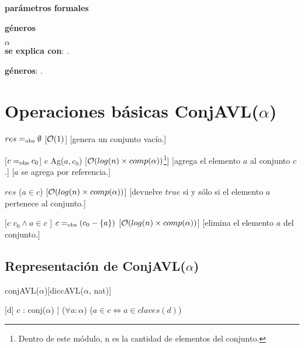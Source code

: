 \begin{Interfaz}
  \textbf{parámetros formales}\parindent\\
  \parbox{1.7cm}{\textbf{géneros}} $\alpha$\\	
	
  \textbf{se explica con}: .

  \textbf{géneros}: .

  \section*{Operaciones básicas ConjAVL($\alpha$)}

  {$res =_{\mathrm{obs}} \emptyset$}
  [$\mathcal{O}(1)$]
  [genera un conjunto vacío.]

  [$c =_{\mathrm{obs}} c_0$]  
  {$c$ \igobs Ag($a,c_0$)}
  [$\mathcal{O}(log(n) \times comp(\alpha))$\footnote{Dentro de este módulo, n es la cantidad de elementos del conjunto.}]
  [agrega el elemento $a$ al conjunto $c$.]
  [$a$ se agrega por referencia.]
    
  {$res$ \igobs ($a\in c$) }
  [$\mathcal{O}(log(n) \times comp(\alpha))$]
  [devuelve $true$ si y sólo si el elemento $a$ pertenece al conjunto.]
  
  [$c$ \igobs $c_0 \land a \in c$ ]
  {$c =_{\mathrm{obs}} (c_0 - \{a\})$}
  [$\mathcal{O}(log(n) \times comp(\alpha))$]
  [elimina el elemento $a$ del conjunto.] 
  
\end{Interfaz}

\begin{Representacion}
    
  \section*{Representación de ConjAVL($\alpha$)}

  \begin{Estructura}{conjAVL($\alpha$)}[diccAVL($\alpha$, nat)]
  \end{Estructura}
  
  
  [d]{
	$c$ : conj($\alpha$) | ($\forall a: \alpha$) ($a\in c \Leftrightarrow a\in claves(d)$)}
\end{Representacion}


